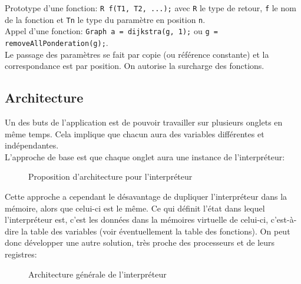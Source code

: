 \documentclass[french]{article}
\begin{document}
				Prototype d'une fonction: \texttt{R f(T1, T2, ...);} avec \texttt{R} le type de retour, \texttt{f} le nom de la fonction et \texttt{Tn} le type du paramètre en position \texttt{n}.\\
				
				Appel d'une fonction: \texttt{Graph a = dijkstra(g, 1);} ou \texttt{g = removeAllPonderation(g);}.\\
				
				Le passage des paramètres se fait par copie (ou référence constante) et la correspondance est par position. On autorise la surcharge des fonctions.
			
		\subsection{Architecture}
			Un des buts de l'application est de pouvoir travailler sur plusieurs onglets en même temps. Cela implique que chacun aura des variables différentes et indépendantes.\\
			
			L'approche de base est que chaque onglet aura une instance de l'interpréteur:
			
			\begin{figure}[H]
				\centering
				\caption{Proposition d'architecture pour l'interpréteur}
			\end{figure}
			
			Cette approche a cependant le désavantage de dupliquer l'interpréteur dans la mémoire, alors que celui-ci est le même. Ce qui définit l'état dans lequel l'interpréteur est, c'est les données dans la mémoires virtuelle de celui-ci, c'est-à-dire la table des variables (voir éventuellement la table des fonctions). On peut donc développer une autre solution, très proche des processeurs et de leurs registres:
			
			\begin{figure}[H]
				\centering
				\caption{Architecture générale de l'interpréteur}
			\end{figure}
			
\end{document}

